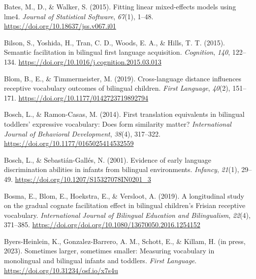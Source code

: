 \documentclass[
  ,man,floatsintext]{apa6}
\newlength{\cslhangindent}
\newlength{\cslentryspacingunit} %
\newenvironment{CSLReferences}[2] %
 {%
  \setlength{\parindent}{0pt}
  \ifodd #1
  \let\oldpar\par
  \def\par{\hangindent=\cslhangindent\oldpar}
  \fi
  \setlength{\parskip}{#2\cslentryspacingunit}
 }%
 {}
\begin{document}
\begingroup
\setlength{\parindent}{-0.5in}

\hypertarget{refs}{}
\begin{CSLReferences}{1}{0}
\leavevmode{}%
Bates, M., D., \& Walker, S. (2015). Fitting linear mixed-effects models using lme4. \emph{Journal of Statistical Software}, \emph{67}(1), 1--48. \url{https://doi.org/10.18637/jss.v067.i01}

\leavevmode{}%
Bilson, S., Yoshida, H., Tran, C. D., Woods, E. A., \& Hills, T. T. (2015). Semantic facilitation in bilingual first language acquisition. \emph{Cognition}, \emph{140}, 122--134. \url{https://doi.org/10.1016/j.cognition.2015.03.013}

\leavevmode{}%
Blom, B., E., \& Timmermeister, M. (2019). Cross-language distance influences receptive vocabulary outcomes of bilingual children. \emph{First Language}, \emph{40}(2), 151--171. \url{https://doi.org/10.1177/0142723719892794}

\leavevmode{}%
Bosch, L., \& Ramon-Casas, M. (2014). First translation equivalents in bilingual toddlers' expressive vocabulary: Does form similarity matter? \emph{International Journal of Behavioral Development}, \emph{38}(4), 317--322. \url{https://doi.org/10.1177/0165025414532559}

\leavevmode{}%
Bosch, L., \& Sebastián-Gallés, N. (2001). Evidence of early language discrimination abilities in infants from bilingual environments. \emph{Infancy}, \emph{21}(1), 29--49. \url{https://doi.org/10.1207/S15327078IN0201_3}

\leavevmode{}%
Bosma, E., Blom, E., Hoekstra, E., \& Versloot, A. (2019). A longitudinal study on the gradual cognate facilitation effect in bilingual children's {F}risian receptive vocabulary. \emph{International Journal of Bilingual Education and Bilingualism}, \emph{22}(4), 371--385. \url{https://doi.org/doi.org/10.1080/13670050.2016.1254152}

\leavevmode{}%
Byers-Heinlein, K., Gonzalez-Barrero, A. M., Schott, E., \& Killam, H. (in press, 2023). Sometimes larger, sometimes smaller: Measuring vocabulary in monolingual and bilingual infants and toddlers. \emph{First Language}. \url{https://doi.org/10.31234/osf.io/x7s4u}


\end{CSLReferences}
\end{document}
